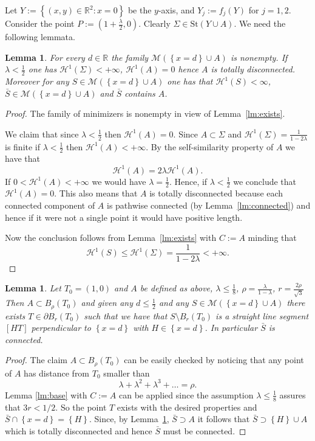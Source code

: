 \documentclass{amsart}
\newcommand{\RR}{\mathbb R}
\renewcommand{\H}{\mathcal H}
\newcommand{\ENCLOSE}[1]{\left\{#1\right\}}
\newcommand{\St}{\mathrm{St}}
\newcommand{\M}{\mathcal{M}}
\renewcommand{\H}{\mathcal{H}}
\newtheorem{lemma}[theorem]{Lemma}
\theoremstyle{definition}
\theoremstyle{remark}
\begin{document}
Let $Y:=\ENCLOSE{(x,y)\in\RR^2\colon x=0}$ be the $y$-axis,
and $Y_j := f_j(Y)$ for $j=1,2$.
Consider the point $P:=(1+\frac\lambda 2,0)$.
Clearly $\Sigma\in \St(Y\cup A)$.
We need the following lemmata.

\begin{lemma}\label{lm:existsA} 
  For every $d\in \RR$ the family $\M(\ENCLOSE{x=d}\cup A)$ is nonempty.
  If $\lambda < \frac 1 2$
  one has $\H^1(\Sigma)<+\infty$, $\H^1(A)=0$ hence $A$ is totally disconnected.
  Moreover for any $S \in \M(\ENCLOSE{x=d}\cup A)$ 
  one has that $\H^1(S)<\infty$,
  $\bar S\in \M(\ENCLOSE{x=d}\cup A)$ and
  $\bar S$ contains $A$.
\end{lemma}
%
\begin{proof}
  The family of minimizers is nonempty in view of Lemma~\ref{lm:exists}.

  We claim that since $\lambda < \frac 1 2$ then $\H^1(A)=0$. 
  Since $A\subset \Sigma$ and $\H^1(\Sigma)=\frac{1}{1-2\lambda}$
  is finite if $\lambda<\frac 1 2$ then $\H^1(A)<+\infty$.
  By the self-similarity property of $A$ we have that 
  \[
  \H^1(A) = 2 \lambda \H^1(A).
  \]
  If $0<\H^1(A)<+\infty$ we would have $\lambda = \frac 1 2$.
  Hence, if $\lambda < \frac 1 2$ we conclude that $\H^1(A)=0$.
  This also means that $A$ is totally disconnected because each connected 
  component of $A$ is pathwise connected (by Lemma~\ref{lm:connected}) 
  and hence if it were not a single point it would have positive length.
    
  Now the conclusion follows from Lemma~\ref{lm:exists} with $C:=A$ 
  minding that 
  \[
    \H^1(S)\le \H^1(\Sigma) = \frac{1}{1-2\lambda}<+\infty.
  \]
\end{proof}

\begin{lemma}\label{lm:01}
  Let $T_0=(1,0)$ and $A$ be defined as above,
  $\lambda \le \frac 1 8$,
  $\rho= \frac{\lambda}{1-\lambda}$,
  $r=\frac{2\rho}{\sqrt 3}$
  Then $A\subset B_\rho(T_0)$ and 
  given any $d\le \frac 1 2$ and any
  $S\in \M(\ENCLOSE{x=d}\cup A)$ 
  there exists $T\in \partial B_r(T_0)$ such that
  we have that $S\setminus B_r(T_0)$ is a straight line segment
  $[HT]$ perpendicular to $\ENCLOSE{x=d}$ 
  with $H\in \ENCLOSE{x=d}$.
  In particular $\bar S$ is connected.
\end{lemma}
\begin{proof}
  The claim $A\subset B_\rho(T_0)$ can be easily checked
  by noticing that any point of $A$ has distance
  from $T_0$ smaller than 
  \[
      \lambda + \lambda^2 + \lambda^3 + \dots = \rho.
  \]
  Lemma \ref{lm:base} with $C:=A$ 
  can be applied since the assumption $\lambda \le \frac 1 8$ assures 
  that $3r < 1/2$.
  So the point $T$ exists with the desired properties and 
  $\bar S\cap \ENCLOSE{x=d} =\ENCLOSE{H}$.
  Since, by Lemma~\ref{lm:existsA}, $\bar S \supset A$
  it follows that $\bar S \supset \ENCLOSE{H}\cup A$ which is totally disconnected 
  and hence $\bar S$ must be connected.
\end{proof}
\end{document}
